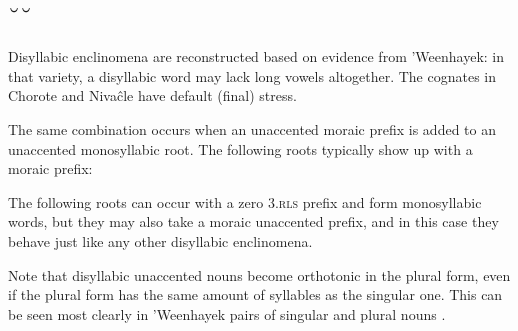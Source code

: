 \subsection{˘˘} \label{corta-corta}

Disyllabic enclinomena are reconstructed based on evidence from ’Weenhayek: in that variety, a disyllabic word may lack long vowels altogether. The cognates in Chorote and Nivaĉle have default (final) stress.

\begin{exe}
    \ex \coalabssg
    \ex \jaguar
    \ex \treensg
    \ex \mancwsg
    \ex \vulturesg
    \ex \holeabs
    \ex \two
    \ex \starnsg
    \ex \shoot
    \ex \carrysh
    \ex \termitehouseits
    \ex \bromelia
    \ex \walk
    \ex \nightncw
    \ex \fatalhaitssg
    \ex \aloja
    \ex \doradocwsg
    \ex \meatitssg
\end{exe}

The same combination occurs when an unaccented moraic prefix is added to an unaccented monosyllabic root. The following roots typically show up with a moraic prefix:

\begin{exe}
    \ex \throwpush
    \ex \takeaway
    \ex \tailsg
    \ex \torn
    \ex \earkfesg
    \ex \handsg
    \ex \hornclubsg
    \ex \withstand
    \ex \petsg
    \ex \languagewordsg
    \ex \toolnsg
    \ex \yicalhuksg
    \ex \sleep
    \ex \smelln
    \ex \fatpesg
    \ex \fence
    \ex \lid
    \ex \vein
    \ex \vaginasg
    \ex \basetrunk
    \ex \eyesg
    \ex \spillcw
    \ex \throwv
    \ex \suckcw
    \ex \placen
    \ex \necksg
    \ex \clothes
    \ex \pricesg
    \ex \earthsg
    \ex \firewoodhuksg
\end{exe}

The following roots can occur with a zero 3.{\textsc{rls}} prefix and form monosyllabic words, but they may also take a moraic unaccented prefix, and in this case they behave just like any other disyllabic enclinomena.
 
\begin{exe}
    \ex \sprout
    \ex \suckb
    \ex \swallow
    \ex \invite
    \ex \dig
    \ex \eatvt
\end{exe}

Note that disyllabic unaccented nouns become orthotonic in the plural form, even if the plural form has the same amount of syllables as the singular one. This can be seen most clearly in 'Weenhayek pairs of singular and plural nouns .

